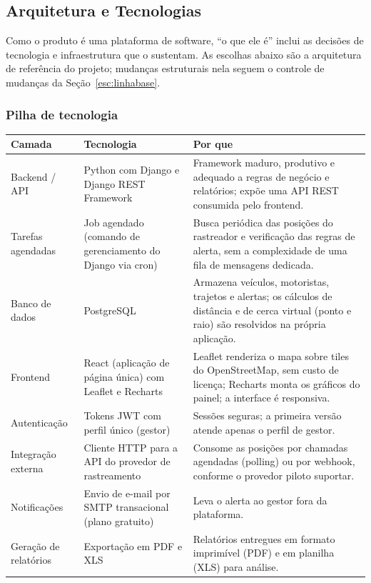 \documentclass[11pt,a4paper]{article}
\begin{document}
\subsection{Arquitetura e Tecnologias}\label{esc:arquitetura}
Como o produto é uma plataforma de software, ``o que ele é'' inclui as decisões de tecnologia e infraestrutura que o sustentam. As escolhas abaixo são a arquitetura de referência do projeto; mudanças estruturais nela seguem o controle de mudanças da Seção~\ref{esc:linhabase}.

\subsubsection*{Pilha de tecnologia}
\begin{center}
\begin{tabularx}{\textwidth}{l L L}
\toprule
\textbf{Camada} & \textbf{Tecnologia} & \textbf{Por que} \\
\midrule
Backend / API & Python com Django e Django REST Framework & Framework maduro, produtivo e adequado a regras de negócio e relatórios; expõe uma API REST consumida pelo frontend. \\
Tarefas agendadas & Job agendado (comando de gerenciamento do Django via cron) & Busca periódica das posições do rastreador e verificação das regras de alerta, sem a complexidade de uma fila de mensagens dedicada. \\
Banco de dados & PostgreSQL & Armazena veículos, motoristas, trajetos e alertas; os cálculos de distância e de cerca virtual (ponto e raio) são resolvidos na própria aplicação. \\
Frontend & React (aplicação de página única) com Leaflet e Recharts & Leaflet renderiza o mapa sobre tiles do OpenStreetMap, sem custo de licença; Recharts monta os gráficos do painel; a interface é responsiva. \\
Autenticação & Tokens JWT com perfil único (gestor) & Sessões seguras; a primeira versão atende apenas o perfil de gestor. \\
Integração externa & Cliente HTTP para a API do provedor de rastreamento & Consome as posições por chamadas agendadas (polling) ou por webhook, conforme o provedor piloto suportar. \\
Notificações & Envio de e-mail por SMTP transacional (plano gratuito) & Leva o alerta ao gestor fora da plataforma. \\
Geração de relatórios & Exportação em PDF e XLS & Relatórios entregues em formato imprimível (PDF) e em planilha (XLS) para análise. \\
\bottomrule
\end{tabularx}
\end{center}
\end{document}
